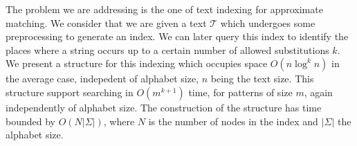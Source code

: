 The problem we are addressing is the one of text indexing for approximate matching. We consider that we are given a text $\mathcal{T}$ which undergoes some preprocessing to generate an index. We can later query this index to identify the places where a string occurs up to a certain number of allowed substitutions $k$. We present a structure for this indexing which occupies space $O(n\log^kn)$ in the average case, indepedent of alphabet size, $n$ being the text size. This structure support searching in $O(m^{k+1})$ time, for patterns of size $m$, again independently of alphabet size. The construction of the structure has time bounded by $O(N|\Sigma|)$, where $N$ is the number of nodes in the index and $|\Sigma|$ the alphabet size.
